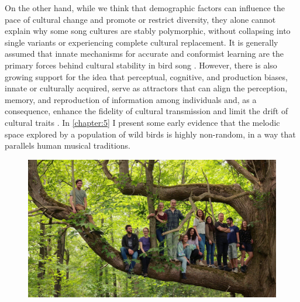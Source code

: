 On the other hand, while we think that demographic factors can influence the pace of cultural change and promote or restrict diversity, they alone cannot explain why some song cultures are stably polymorphic, without collapsing into single variants or experiencing complete cultural replacement. It is generally assumed that innate mechanisms for accurate and conformist learning are the primary forces behind cultural stability in bird song \parencite{lachlan2018, lachlan2003a}. However, there is also growing support for the idea that perceptual, cognitive, and production biases, innate or culturally acquired, serve as attractors that can align the perception, memory, and reproduction of information among individuals and, as a consequence, enhance the fidelity of cultural transmission and limit the drift of cultural traits \parencite{feher2009, saldana2019, trehub2015}. In \autoref{chapter:5} I present some early evidence that the melodic space explored by a population of wild birds is highly non-random, in a way that parallels human musical traditions.

\begin{figure}[th!]
    \centering
    \includegraphics[width=\linewidth]{figures/chapter_1/wytham-group.jpg}
    \label{c1_fig:whytham-group}
\end{figure}

